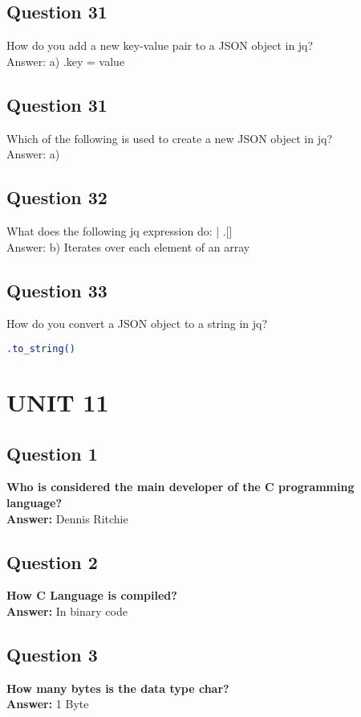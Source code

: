 \documentclass[11pt,parskip]{scrartcl}
\begin{document}
\subsection*{Question 31}
How do you add a new key-value pair to a JSON object in jq? \\
Answer: a) .key = value

\subsection*{Question 31}
Which of the following is used to create a new JSON object in jq? \\
Answer: a) {}

\subsection*{Question 32}

What does the following jq expression do: | .[] \\
Answer: b) Iterates over each element of an array

\subsection*{Question 33}
How do you convert a JSON object to a string in jq? \\
\begin{lstlisting}[language=bash]
.to_string()
\end{lstlisting}

\section*{UNIT 11}

\subsection*{Question 1}
\textbf{Who is considered the main developer of the C programming language?} \\
\textbf{Answer: } Dennis Ritchie

\subsection*{Question 2}
\textbf{How C Language is compiled?} \\
\textbf{Answer:} In binary code

\subsection*{Question 3}
\textbf{How many bytes is the data type char?} \\
\textbf{Answer:} 1 Byte
\end{document}
